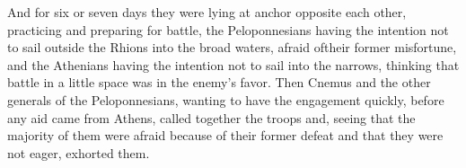 \documentclass{article}
\begin{document}
And for six or seven days they were lying at anchor opposite each other,
practicing and preparing for battle,
the Peloponnesians having the intention not to sail outside the Rhions into the broad waters,
afraid oftheir former misfortune,
and the Athenians having the intention not to sail into the narrows,
thinking that battle in a little space was in the enemy's favor.
Then Cnemus and the other generals of the Peloponnesians,
wanting to have the engagement quickly, before any aid came from Athens, called together the troops
and, seeing that the majority of them were afraid because of their former defeat
and that they were not eager, exhorted them. \\
\end{document}
